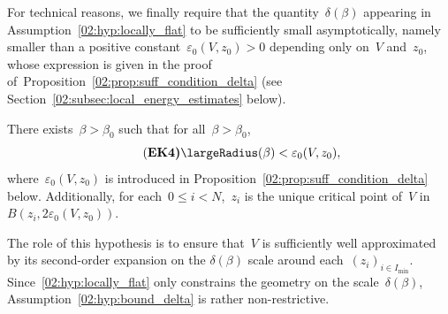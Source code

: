     
    For technical reasons, we finally require that the quantity~$\delta(\beta)$ appearing in Assumption~\eqref{02:hyp:locally_flat} to be sufficiently small asymptotically, namely smaller than a positive constant~$\varepsilon_0(V,z_0)>0$ depending only on~$V$ and~$z_0$, whose expression is given in the proof of~Proposition~\ref{02:prop:suff_condition_delta} (see Section~\ref{02:subsec:local_energy_estimates} below).
    \begin{hypothesis}
        There exists~$\beta>\beta_0$ such that for all~$\beta>\beta_0$,
        \begin{equation}
            \tag{\bf EK4}
            \label{02:hyp:bound_delta}
            \largeRadius(\beta)<\varepsilon_0(V,z_0),
        \end{equation}
        where~$\varepsilon_0(V,z_0)$ is introduced in Proposition~\ref{02:prop:suff_condition_delta} below. Additionally, for each~$0\leq i<N$,~$z_i$ is the unique critical point of~$V$ in~$B(z_i,2\varepsilon_0(V,z_0))$.
    \end{hypothesis}
    The role of this hypothesis is to ensure that~$V$ is sufficiently well approximated by its second-order expansion on the $\delta(\beta)$ scale around each~$(z_i)_{i\in I_{\min}}$.
    Since~\eqref{02:hyp:locally_flat} only constrains the geometry on the scale~$\delta(\beta)$, Assumption~\eqref{02:hyp:bound_delta} is rather non-restrictive.

